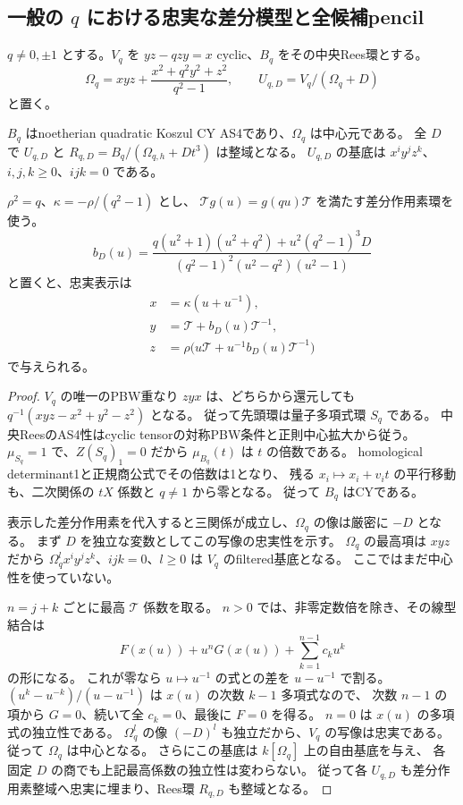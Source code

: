 \subsection{一般の $q$ における忠実な差分模型と全候補pencil}
\label{subsec:quantum-triangle-general}
$q\ne0,\pm1$ とする。$V_q$ を $yz-qzy=x$ cyclic、$B_q$ をその中央Rees環とする。
\[
 \Omega_q=xyz+\frac{x^2+q^2y^2+z^2}{q^2-1},\qquad
 U_{q,D}=V_q/(\Omega_q+D)
\]
と置く。

\begin{theorem}[全 $q,D$ の整域性と差分表示]
\label{thm:quantum-triangle-faithful-difference}
$B_q$ はnoetherian quadratic Koszul CY AS4であり、$\Omega_q$ は中心元である。
全 $D$ で $U_{q,D}$ と $R_{q,D}=B_q/(\Omega_{q,h}+Dt^3)$ は整域となる。
$U_{q,D}$ の基底は $x^iy^jz^k$、$i,j,k\ge0$、$ijk=0$ である。

$\rho^2=q$、$\kappa=-\rho/(q^2-1)$ とし、
$\mathcal T g(u)=g(qu)\mathcal T$ を満たす差分作用素環を使う。
\[
 b_D(u)=\frac{q(u^2+1)(u^2+q^2)+u^2(q^2-1)^3D}
                  {(q^2-1)^2(u^2-q^2)(u^2-1)}
\]
と置くと、忠実表示は
\[
 \begin{aligned}
 x&=\kappa(u+u^{-1}),\\
 y&=\mathcal T+b_D(u)\mathcal T^{-1},\\
 z&=\rho\bigl(u\mathcal T+u^{-1}b_D(u)\mathcal T^{-1}\bigr)
 \end{aligned}
\]
で与えられる。
\end{theorem}
\begin{proof}
$V_q$ の唯一のPBW重なり $zyx$ は、どちらから還元しても
$q^{-1}(xyz-x^2+y^2-z^2)$ となる。
従って先頭環は量子多項式環 $S_q$ である。
中央ReesのAS4性はcyclic tensorの対称PBW条件と正則中心拡大から従う。
$\mu_{S_q}=1$ で、$Z(S_q)_1=0$ だから $\mu_{B_q}(t)$ は $t$ の倍数である。
homological determinant1と正規商公式でその倍数は1となり、
残る $x_i\mapsto x_i+v_it$ の平行移動も、二次関係の $tX$ 係数と $q\ne1$ から零となる。
従って $B_q$ はCYである。

表示した差分作用素を代入すると三関係が成立し、$\Omega_q$ の像は厳密に $-D$ となる。
まず $D$ を独立な変数としてこの写像の忠実性を示す。
$\Omega_q$ の最高項は $xyz$ だから
$\Omega_q^l x^iy^jz^k$、$ijk=0$、$l\ge0$ は $V_q$ のfiltered基底となる。
ここではまだ中心性を使っていない。

$n=j+k$ ごとに最高 $\mathcal T$ 係数を取る。
$n>0$ では、非零定数倍を除き、その線型結合は
\[
 F(x(u))+u^nG(x(u))+\sum_{k=1}^{n-1}c_ku^k
\]
の形になる。
これが零なら $u\mapsto u^{-1}$ の式との差を $u-u^{-1}$ で割る。
$(u^k-u^{-k})/(u-u^{-1})$ は $x(u)$ の次数 $k-1$ 多項式なので、
次数 $n-1$ の項から $G=0$、続いて全 $c_k=0$、最後に $F=0$ を得る。
$n=0$ は $x(u)$ の多項式の独立性である。
$\Omega_q^l$ の像 $(-D)^l$ も独立だから、$V_q$ の写像は忠実である。
従って $\Omega_q$ は中心となる。
さらにこの基底は $k[\Omega_q]$ 上の自由基底を与え、
各固定 $D$ の商でも上記最高係数の独立性は変わらない。
従って各 $U_{q,D}$ も差分作用素整域へ忠実に埋まり、Rees環 $R_{q,D}$ も整域となる。
\end{proof}

